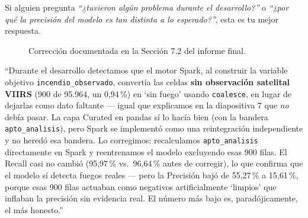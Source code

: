 \documentclass[11pt,a4paper]{article}
\begin{document}
Si alguien pregunta \emph{``¿tuvieron alg\'un problema durante el desarrollo?''} o \emph{``¿por qu\'e la precisi\'on del modelo es tan distinta a lo esperado?''}, esta es tu mejor respuesta.

\begin{figure}[H]
\centering
{}
\caption{Correcci\'on documentada en la Secci\'on 7.2 del informe final.}
\end{figure}

\begin{decirbox}[title={Gui\'on sugerido (m\'emoralo o parafras\'ealo con tus palabras)}]
``Durante el desarrollo detectamos que el motor Spark, al construir la variable objetivo \texttt{incendio\_observado}, convert\'ia las celdas \textbf{sin observaci\'on satelital VIIRS} (900 de 95.964, un 0,94\,\%) en `sin fuego' usando \texttt{coalesce}, en lugar de dejarlas como dato faltante --- igual que explicamos en la diapositiva 7 que \emph{no} deb\'ia pasar. La capa Curated en pandas s\'i lo hac\'ia bien (con la bandera \texttt{apto\_analisis}), pero Spark se implement\'o como una reintegraci\'on independiente y no hered\'o esa bandera. Lo corregimos: recalculamos \texttt{apto\_analisis} directamente en Spark y reentrenamos el modelo excluyendo esas 900 filas. El Recall casi no cambi\'o (95,97\,\% vs.\ 96,64\,\% antes de corregir), lo que confirma que el modelo s\'i detecta fuegos reales --- pero la Precisi\'on baj\'o de 55,27\,\% a 15,61\,\%, porque esas 900 filas actuaban como negativos artificialmente `limpios' que inflaban la precisi\'on sin evidencia real. El n\'umero m\'as bajo es, paradójicamente, el m\'as honesto.''
\end{decirbox}
\end{document}
